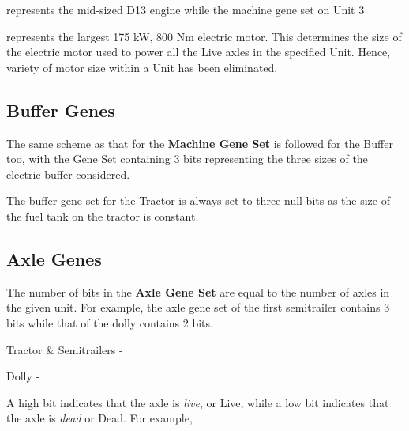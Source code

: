 \documentclass[ExampleMasters.tex]{subfiles}
\begin{document}
			represents the mid-sized D13 engine while the machine gene set on Unit 3\\

			\centerline{\framebox{0}}
			\vspace{0.1in}

			represents the largest 175 kW, 800 Nm electric motor. This determines the size of the electric motor used to power all the Live axles in the specified Unit. Hence, variety of motor size within a Unit has been eliminated.\\

		\subsection{Buffer Genes}
			The same scheme as that for the \textbf{Machine Gene Set} is followed for the Buffer too, with the Gene Set containing 3 bits representing the three sizes of the electric buffer considered.\\

			\centerline{}
			\vspace{0.1in}

			The buffer gene set for the Tractor is always set to three null bits as the size of the fuel tank on the tractor is constant.\\

		\subsection{Axle Genes}
			The number of bits in the \textbf{Axle Gene Set} are equal to the number of axles in the given unit. For example, the axle gene set of the first semitrailer contains 3 bits while that of the dolly contains 2 bits.\\

			\centerline{Tractor \& Semitrailers - }
			\vspace{0.1in}

			\centerline{Dolly - }
			\vspace{0.1in}

			A high bit indicates that the axle is \textit{live}, or Live, while a low bit indicates that the axle is \textit{dead} or Dead. For example,\\

			\centerline{}
			\vspace{0.1in}
\end{document}
